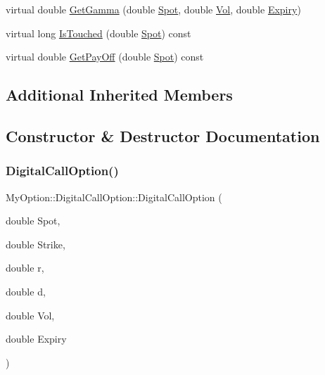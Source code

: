 \begin{DoxyCompactItemize}
\item 
virtual double \hyperlink{classMyOption_1_1DigitalCallOption_aa4fcb3de1cbeb6eea6a41149ae884402}{Get\+Gamma} (double \hyperlink{classMyOption_1_1Option_a6c6f01d75cde7e92d16a6d8d6f331a1d}{Spot}, double \hyperlink{classMyOption_1_1Option_a5d6002c14b335c782873bf1437113513}{Vol}, double \hyperlink{classMyOption_1_1Option_ac1adacb417fede41d151b9cda05bcb3d}{Expiry})
\item 
virtual long \hyperlink{classMyOption_1_1DigitalCallOption_a121b168de89ae10c90d2e11036588b29}{Is\+Touched} (double \hyperlink{classMyOption_1_1Option_a6c6f01d75cde7e92d16a6d8d6f331a1d}{Spot}) const
\item 
virtual double \hyperlink{classMyOption_1_1DigitalCallOption_a260e5ad85712e35131bf7b583d0c8525}{Get\+Pay\+Off} (double \hyperlink{classMyOption_1_1Option_a6c6f01d75cde7e92d16a6d8d6f331a1d}{Spot}) const
\end{DoxyCompactItemize}
\subsection*{Additional Inherited Members}


\subsection{Constructor \& Destructor Documentation}
\hypertarget{classMyOption_1_1DigitalCallOption_ab09ac328d7fe9da0ba735c36e9929ad5}{}\label{classMyOption_1_1DigitalCallOption_ab09ac328d7fe9da0ba735c36e9929ad5} 
\subsubsection{\texorpdfstring{Digital\+Call\+Option()}{DigitalCallOption()}}
{\footnotesize\ttfamily My\+Option\+::\+Digital\+Call\+Option\+::\+Digital\+Call\+Option (\begin{DoxyParamCaption}\item[{double}]{Spot,  }\item[{double}]{Strike,  }\item[{double}]{r,  }\item[{double}]{d,  }\item[{double}]{Vol,  }\item[{double}]{Expiry }\end{DoxyParamCaption})}

